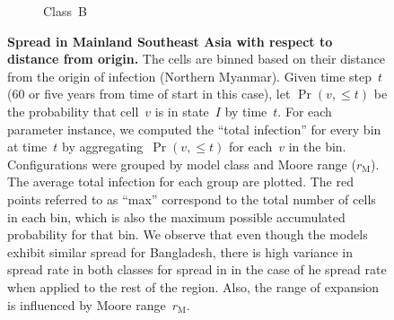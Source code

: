 \documentclass[10pt]{article}
\newcommand{\mooreRange}{r_\mathrm{M}}
\theoremstyle{definition}
\begin{document}
\begin{figure}[htb]
\begin{subfigure}[b]{.47\textwidth}
    \caption{Class~B\label{fig:spreadRateB}}
\end{subfigure}
\caption{\textbf{Spread in Mainland Southeast Asia with respect to distance
from origin.} The cells are binned based on their distance from the origin
of infection (Northern Myanmar). Given time step~$t$ (60 or five years from
time of start in this case), let $\Pr(v,\le t)$ be the probability that
cell~$v$ is in state~$I$ by time~$t$. For each parameter instance, we
computed the ``total infection'' for every bin at time~$t$ by
aggregating~$\Pr(v,\le t)$ for each~$v$ in the bin. Configurations were
grouped by model class and Moore range ($\mooreRange$). The average total
infection for each group are plotted.  The red points referred to as
``max'' correspond to the total number of cells in each bin, which is also
the maximum possible accumulated probability for that bin. We observe that
even though the models exhibit similar spread for Bangladesh, there is high
variance in spread rate in both classes for spread in in the case of he
spread rate when applied to the rest of the region. Also, the range of
expansion is influenced by Moore range~$\mooreRange$.
\label{fig:spreadRate}
}
\end{figure}


\end{document}
